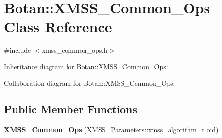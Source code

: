 \hypertarget{class_botan_1_1_x_m_s_s___common___ops}{}\section{Botan\+:\+:X\+M\+S\+S\+\_\+\+Common\+\_\+\+Ops Class Reference}
\label{class_botan_1_1_x_m_s_s___common___ops}


{\ttfamily \#include $<$xmss\+\_\+common\+\_\+ops.\+h$>$}



Inheritance diagram for Botan\+:\+:X\+M\+S\+S\+\_\+\+Common\+\_\+\+Ops\+:


Collaboration diagram for Botan\+:\+:X\+M\+S\+S\+\_\+\+Common\+\_\+\+Ops\+:
\subsection*{Public Member Functions}
\begin{DoxyCompactItemize}
\item 
\mbox{\label{class_botan_1_1_x_m_s_s___common___ops_a8f4946af95aa4f90c376a57db86541e6}} 
{\bfseries X\+M\+S\+S\+\_\+\+Common\+\_\+\+Ops} (X\+M\+S\+S\+\_\+\+Parameters\+::xmss\+\_\+algorithm\+\_\+t oid)
\end{DoxyCompactItemize}
